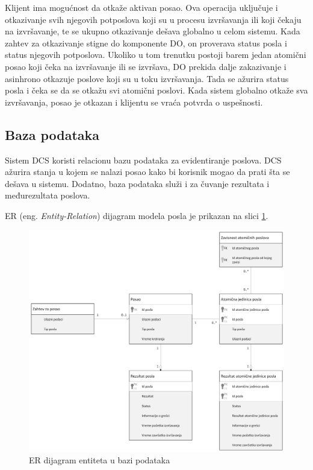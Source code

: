 \documentclass[12pt,oneside]{memoir}
\begin{document}
Klijent ima mogućnost da otkaže aktivan posao. Ova operacija uključuje i otkazivanje svih njegovih potposlova koji su u procesu izvršavanja ili koji čekaju na izvršavanje, te se ukupno otkazivanje dešava globalno u celom sistemu.
Kada zahtev za otkazivanje stigne do komponente DO, on proverava status posla i status njegovih potposlova. Ukoliko u tom trenutku postoji barem jedan atomični posao koji čeka na izvršavanje ili se izvršava, DO prekida dalje zakazivanje i asinhrono otkazuje poslove koji su u toku izvršavanja. Tada se ažurira status posla i čeka se da se otkažu svi atomični poslovi. Kada sistem globalno otkaže sva izvršavanja, posao je otkazan i klijentu se vraća potvrda o uspešnosti.


\subsection{Baza podataka}

Sistem DCS koristi relacionu bazu podataka za evidentiranje poslova. DCS ažurira stanja u kojem se nalazi posao kako bi korisnik mogao da prati šta se dešava u sistemu. Dodatno, baza podataka služi i za čuvanje rezultata i međurezultata poslova.

ER (eng. \emph{Entity-Relation}) dijagram modela posla je prikazan na slici \ref{fig:erposao}.

\begin{figure}[!ht]
  \centering
  \includegraphics[width=1.0\textwidth]{./images/uml_er_dijagram_posao.png}
  \caption{ER dijagram entiteta u bazi podataka}
  \label{fig:erposao}
\end{figure}
\end{document}

